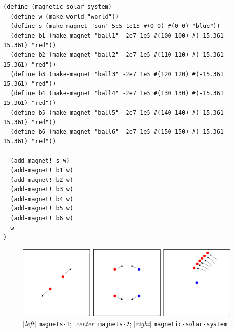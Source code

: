 \documentclass{article}
\begin{document}
\begin{verbatim}
(define (magnetic-solar-system)
  (define w (make-world "world"))
  (define s (make-magnet "sun" 5e5 1e15 #(0 0) #(0 0) "blue"))
  (define b1 (make-magnet "ball1" -2e7 1e5 #(100 100) #(-15.361 15.361) "red"))
  (define b2 (make-magnet "ball2" -2e7 1e5 #(110 110) #(-15.361 15.361) "red"))
  (define b3 (make-magnet "ball3" -2e7 1e5 #(120 120) #(-15.361 15.361) "red"))
  (define b4 (make-magnet "ball4" -2e7 1e5 #(130 130) #(-15.361 15.361) "red"))
  (define b5 (make-magnet "ball5" -2e7 1e5 #(140 140) #(-15.361 15.361) "red"))
  (define b6 (make-magnet "ball6" -2e7 1e5 #(150 150) #(-15.361 15.361) "red"))

  (add-magnet! s w)
  (add-magnet! b1 w)
  (add-magnet! b2 w)
  (add-magnet! b3 w)
  (add-magnet! b4 w)
  (add-magnet! b5 w)
  (add-magnet! b6 w)
  w
)
\end{verbatim}

\begin{figure}[h!]
  \centering
 \includegraphics[width=\textwidth,height=\textheight,keepaspectratio]{figs/magnetism.png}
  \caption{[\textit{left}] \texttt{magnets-1}; [\textit{center}] \texttt{magnets-2}; [\textit{right}] \texttt{magnetic-solar-system}}
  \label{figure:magnetism}
\end{figure}
\end{document}
